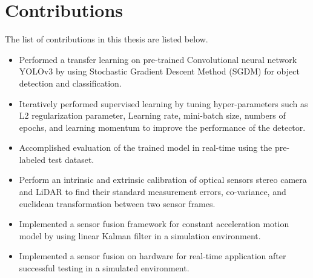 \section{Contributions} 
The list of contributions in this thesis are listed below. 

\begin{itemize}
    \item Performed a transfer learning on pre-trained Convolutional neural network YOLOv3 by using Stochastic Gradient Descent Method (SGDM) for object detection and classification. 
    \item Iteratively performed supervised learning by tuning hyper-parameters such as L2 regularization parameter, Learning rate, mini-batch size, numbers of epochs, and learning momentum to improve the performance of the detector.
    \item Accomplished evaluation of the trained model in real-time using the pre-labeled test dataset.
    \item Perform an intrinsic and extrinsic calibration of optical sensors stereo camera and LiDAR to find their standard measurement errors,  co-variance, and euclidean transformation between two sensor frames. 
    \item Implemented a sensor fusion framework for constant acceleration motion model by using linear Kalman filter in a simulation environment. 
    \item Implemented a sensor fusion on hardware for real-time application after successful testing in a simulated environment.
\end{itemize}



